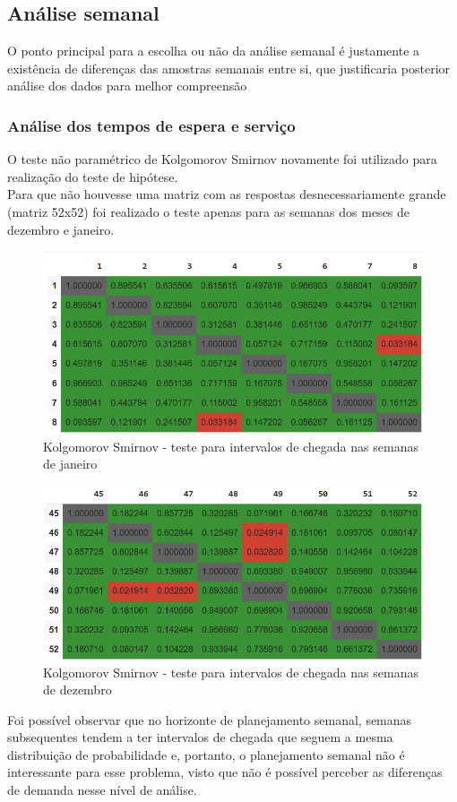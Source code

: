 \subsection{Análise semanal}
O ponto principal para a escolha ou não da análise semanal é justamente a existência de diferenças das amostras semanais entre si, que justificaria posterior análise dos dados para melhor compreensão\\
\subsubsection{Análise dos tempos de espera e serviço}
O teste não paramétrico de Kolgomorov Smirnov novamente foi utilizado para realização do teste de hipótese.\\
Para que não houvesse uma matriz com as respostas desnecessariamente grande (matriz 52x52) foi realizado o teste apenas para as semanas dos meses de dezembro e janeiro.\\
\begin{center}
    \begin{figure}[H]
        \includegraphics{analise-de-dados/semanal/janas.png}
        \caption{Kolgomorov Smirnov - teste para intervalos de chegada nas semanas de janeiro}
        \label{fig: jan_as_img}
    \end{figure}
    \begin{figure}[H]
        \includegraphics{analise-de-dados/semanal/dezas.png}
        \caption{Kolgomorov Smirnov - teste para intervalos de chegada nas semanas de dezembro}
        \label{fig: dez_as_img}
    \end{figure}
\end{center}
Foi possível observar que no horizonte de planejamento semanal, semanas subsequentes tendem a ter intervalos de chegada que seguem a mesma distribuição de probabilidade e, portanto, o planejamento semanal não é interessante para esse problema, visto que não é possível perceber as diferenças de demanda nesse nível de análise.